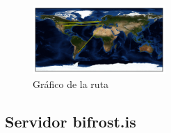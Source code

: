 \begin{figure}[H]
  \centering
    \includegraphics[width=0.45\textwidth]{grafico-rutas/www-uae-ma.png}
  \caption{Gráfico de la ruta}
  \label{entropia-s}
\end{figure}




\subsection{Servidor bifrost.is}

